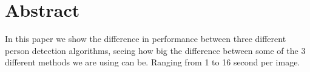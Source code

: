 \section{Abstract}
In this paper we show the difference in performance between three different person detection algorithms, seeing how big the difference between some of the 3 different methods we are using can be. Ranging from 1 to 16 second per image.